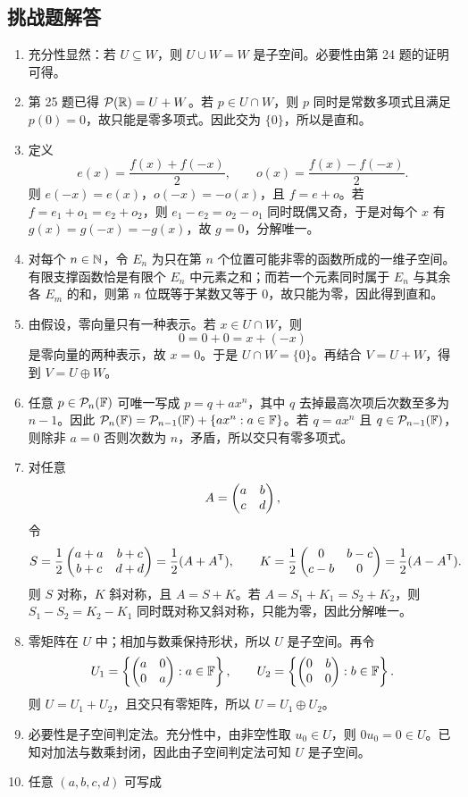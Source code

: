 \subsection*{挑战题解答} \begin{enumerate}[label=\textbf{\arabic*.},start=46]
\item 充分性显然：若 $U\subseteq W$，则 $U\cup W=W$ 是子空间。必要性由第 24 题的证明可得。 \item 第 25 题已得 $\mathcal{P}(\mathbb{R})=U+W$。若 $p\in U\cap W$，则 $p$ 同时是常数多项式且满足 $p(0)=0$，故只能是零多项式。因此交为 $\{0\}$，所以是直和。
\item 定义 \[
e(x)=\frac{f(x)+f(-x)}2, \qquad
o(x)=\frac{f(x)-f(-x)}2. \]
则 $e(-x)=e(x)$，$o(-x)=-o(x)$，且 $f=e+o$。若 $f=e_1+o_1=e_2+o_2$，则 $e_1-e_2=o_2-o_1$ 同时既偶又奇，于是对每个 $x$ 有 $g(x)=g(-x)=-g(x)$，故 $g=0$，分解唯一。 \item 对每个 $n\in\mathbb{N}$，令 $E_n$ 为只在第 $n$ 个位置可能非零的函数所成的一维子空间。有限支撑函数恰是有限个 $E_n$ 中元素之和；而若一个元素同时属于 $E_n$ 与其余各 $E_m$ 的和，则第 $n$ 位既等于某数又等于 $0$，故只能为零，因此得到直和。
\item 由假设，零向量只有一种表示。若 $x\in U\cap W$，则 \[
0=0+0=x+(-x) \]
是零向量的两种表示，故 $x=0$。于是 $U\cap W=\{0\}$。再结合 $V=U+W$，得到 $V=U\oplus W$。 \item 任意 $p\in\mathcal{P}_n(\mathbb{F})$ 可唯一写成 $p=q+ax^n$，其中 $q$ 去掉最高次项后次数至多为 $n-1$。因此 $\mathcal{P}_n(\mathbb{F})=\mathcal{P}_{n-1}(\mathbb{F})+\{ax^n:a\in\mathbb{F}\}$。若 $q=ax^n$ 且 $q\in\mathcal{P}_{n-1}(\mathbb{F})$，则除非 $a=0$ 否则次数为 $n$，矛盾，所以交只有零多项式。
\item 对任意 \[
A=\begin{pmatrix} a&b\\c&d \end{pmatrix}, \]
令 \[
S=\frac12\begin{pmatrix} a+a&b+c\\b+c&d+d \end{pmatrix}=\frac12(A+A^{\mathsf T}), \qquad
K=\frac12\begin{pmatrix} 0&b-c\\c-b&0 \end{pmatrix}=\frac12(A-A^{\mathsf T}). \]
则 $S$ 对称，$K$ 斜对称，且 $A=S+K$。若 $A=S_1+K_1=S_2+K_2$，则 $S_1-S_2=K_2-K_1$ 同时既对称又斜对称，只能为零，因此分解唯一。 \item 零矩阵在 $U$ 中；相加与数乘保持形状，所以 $U$ 是子空间。再令
\[ U_1=\left\{\begin{pmatrix} a&0\\0&a \end{pmatrix}:a\in\mathbb{F}\right\},
\qquad U_2=\left\{\begin{pmatrix} 0&b\\0&0 \end{pmatrix}:b\in\mathbb{F}\right\}.
\] 则 $U=U_1+U_2$，且交只有零矩阵，所以 $U=U_1\oplus U_2$。
\item 必要性是子空间判定法。充分性中，由非空性取 $u_0\in U$，则 $0u_0=0\in U$。已知对加法与数乘封闭，因此由子空间判定法可知 $U$ 是子空间。 \item 任意 $(a,b,c,d)$ 可写成

\end{enumerate}
